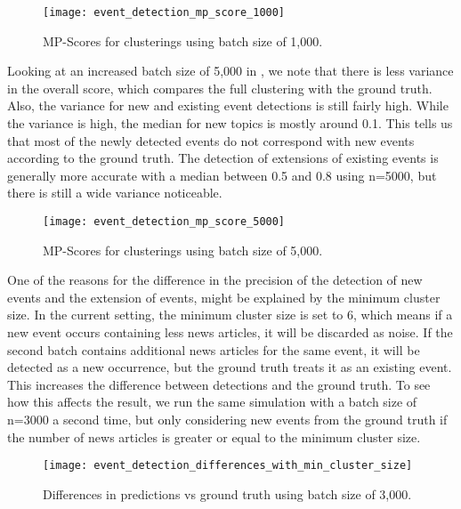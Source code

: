 \begin{figure}[h]
    \centering
    \texttt{[image: event\_detection\_mp\_score\_1000]}
    \caption{MP-Scores for clusterings using batch size of 1,000.}
    \label{fig:event_detection_mp_score_1000}
\end{figure}

Looking at an increased batch size of 5,000 in ,
we note that there is less variance in the overall score, which compares the full clustering with the ground truth.
Also, the variance for new and existing event detections is still fairly high.
While the variance is high, the median for new topics is mostly around 0.1.
This tells us that most of the newly detected events do not correspond with new events according to the ground truth.
The detection of extensions of existing events is generally more accurate
with a median between 0.5 and 0.8 using n=5000, but there is still a wide variance noticeable.

\begin{figure}[h]
    \centering
    \texttt{[image: event\_detection\_mp\_score\_5000]}
    \caption{MP-Scores for clusterings using batch size of 5,000.}
    \label{fig:event_detection_mp_score_5000}
\end{figure}

One of the reasons for the difference in the precision of the detection of new events and the extension of events,
might be explained by the minimum cluster size.
In the current setting, the minimum cluster size is set to 6,
which means if a new event occurs containing less news articles,
it will be discarded as noise.
If the second batch contains additional news articles for the same event,
it will be detected as a new occurrence, but the ground truth treats it as an existing event.
This increases the difference between detections and the ground truth.
To see how this affects the result, we run the same simulation with a batch size of n=3000 a second time,
but only considering new events from the ground truth
if the number of news articles is greater or equal to the minimum cluster size.

\begin{figure}[h]
    \centering
    \texttt{[image: event\_detection\_differences\_with\_min\_cluster\_size]}
    \caption{Differences in predictions vs ground truth using batch size of 3,000.}
    \label{fig:event_detection_differences_with_min_cluster_size}
\end{figure}


